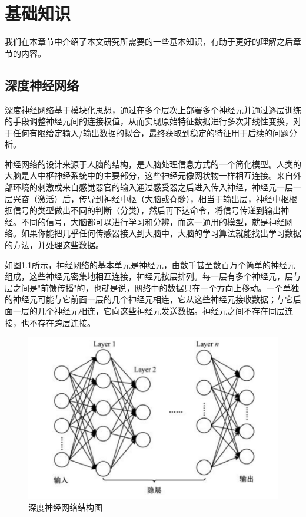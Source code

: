 \chapter{基础知识}
\label{ch2}
我们在本章节中介绍了本文研究所需要的一些基本知识，有助于更好的理解之后章节的内容。

\section{深度神经网络}
深度神经网络基于模块化思想，通过在多个层次上部署多个神经元并通过逐层训练的手段调整神经元间的连接权值，从而实现原始特征数据进行多次非线性变换，对于任何有限给定输入/输出数据的拟合，最终获取到稳定的特征用于后续的问题分析。

神经网络的设计来源于人脑的结构，是人脑处理信息方式的一个简化模型。人类的大脑是人中枢神经系统中的主要部分，这些神经元像网状物一样相互连接。来自外部环境的刺激或来自感觉器官的输入通过感受器之后进入传入神经，神经元一层一层兴奋（激活）后，传导到神经中枢（大脑或脊髓），相当于输出层，神经中枢根据信号的类型做出不同的判断（分类），然后再下达命令，将信号传递到输出神经。不同的信号，大脑都可以进行学习和分辨，而这一通用的模型，就是神经网络。如果你能把几乎任何传感器接入到大脑中，大脑的学习算法就能找出学习数据的方法，并处理这些数据。

如图\ref{fig:深度神经网络结构图}所示，神经网络的基本单元是神经元，由数千甚至数百万个简单的神经元组成，这些神经元密集地相互连接，神经元按层排列。每一层有多个神经元，层与层之间是"前馈传播"的，也就是说，网络中的数据只在一个方向上移动。一个单独的神经元可能与它前面一层的几个神经元相连，它从这些神经元接收数据；与它后面一层的几个神经元相连，它向这些神经元发送数据。神经元之间不存在同层连接，也不存在跨层连接。

\begin{figure}[!hbt]
\centering
	\includegraphics[scale=0.7]{fig2/C2/深度神经网络结构图}%
	\caption{深度神经网络结构图}
	\label{fig:深度神经网络结构图}	
\end{figure}


